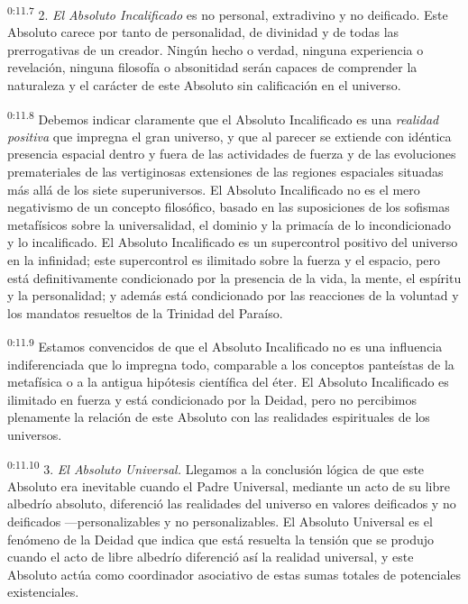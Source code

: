 \par
\textsuperscript{0:11.7} 2. \textit{El Absoluto Incalificado} es no personal, extradivino y no deificado. Este Absoluto carece por tanto de personalidad, de divinidad y de todas las prerrogativas de un creador. Ningún hecho o verdad, ninguna experiencia o revelación, ninguna filosofía o absonitidad serán capaces de comprender la naturaleza y el carácter de este Absoluto sin calificación en el universo.

\par
\textsuperscript{0:11.8} Debemos indicar claramente que el Absoluto Incalificado es una \textit{realidad positiva} que impregna el gran universo, y que al parecer se extiende con idéntica presencia espacial dentro y fuera de las actividades de fuerza y de las evoluciones premateriales de las vertiginosas extensiones de las regiones espaciales situadas más allá de los siete superuniversos. El Absoluto Incalificado no es el mero negativismo de un concepto filosófico, basado en las suposiciones de los sofismas metafísicos sobre la universalidad, el dominio y la primacía de lo incondicionado y lo incalificado. El Absoluto Incalificado es un supercontrol positivo del universo en la infinidad; este supercontrol es ilimitado sobre la fuerza y el espacio, pero está definitivamente condicionado por la presencia de la vida, la mente, el espíritu y la personalidad; y además está condicionado por las reacciones de la voluntad y los mandatos resueltos de la Trinidad del Paraíso.

\par
\textsuperscript{0:11.9} Estamos convencidos de que el Absoluto Incalificado no es una influencia indiferenciada que lo impregna todo, comparable a los conceptos panteístas de la metafísica o a la antigua hipótesis científica del éter. El Absoluto Incalificado es ilimitado en fuerza y está condicionado por la Deidad, pero no percibimos plenamente la relación de este Absoluto con las realidades espirituales de los universos.

\par
\textsuperscript{0:11.10} 3. \textit{El Absoluto Universal.} Llegamos a la conclusión lógica de que este Absoluto era inevitable cuando el Padre Universal, mediante un acto de su libre albedrío absoluto, diferenció las realidades del universo en valores deificados y no deificados ---personalizables y no personalizables. El Absoluto Universal es el fenómeno de la Deidad que indica que está resuelta la tensión que se produjo cuando el acto de libre albedrío diferenció así la realidad universal, y este Absoluto actúa como coordinador asociativo de estas sumas totales de potenciales existenciales.

